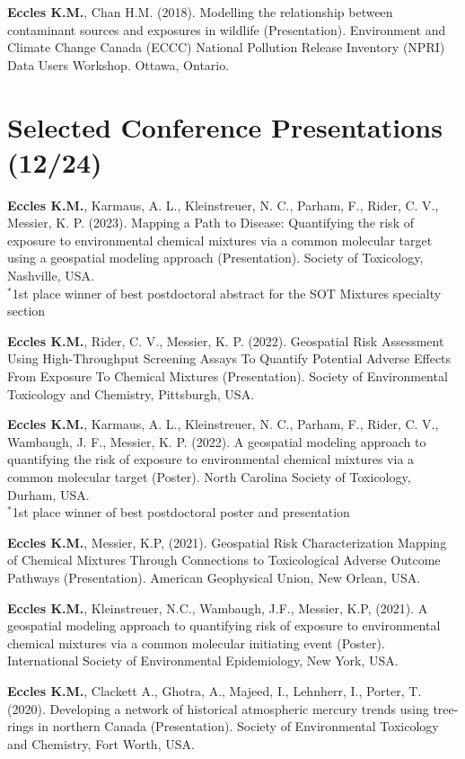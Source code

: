 \documentclass[margin,line]{res}
\begin{document}
\begin{resume}
\textbf{Eccles K.M.}, Chan H.M. (2018). Modelling the relationship between contaminant sources and exposures in wildlife (Presentation). Environment and Climate Change Canada (ECCC) National Pollution Release Inventory (NPRI) Data Users Workshop. Ottawa, Ontario.

\vspace*{.1in}
\section{\sc Selected Conference Presentations (12/24)}

\textbf{Eccles K.M.}, Karmaus, A. L., Kleinstreuer, N. C., Parham, F., Rider, C. V., Messier, K. P. (2023). Mapping a Path to Disease: Quantifying the risk of exposure to environmental chemical mixtures via a common molecular target using a geospatial modeling approach (Presentation). Society of Toxicology, Nashville, USA.\\
$^{*}$1st place winner of best postdoctoral abstract for the SOT Mixtures specialty section

\textbf{Eccles K.M.}, Rider, C. V., Messier, K. P. (2022). Geospatial Risk Assessment Using High-Throughput Screening Assays To Quantify Potential Adverse Effects From Exposure To Chemical Mixtures (Presentation). Society of Environmental Toxicology and Chemistry, Pittsburgh, USA.

\textbf{Eccles K.M.}, Karmaus, A. L., Kleinstreuer, N. C., Parham, F., Rider, C. V., Wambaugh, J. F., Messier, K. P. (2022). A geospatial modeling approach to quantifying the risk of exposure to environmental chemical mixtures via a common molecular target (Poster). North Carolina Society of Toxicology, Durham, USA.\\
$^{*}$1st place winner of best postdoctoral poster and presentation

\textbf{Eccles K.M.}, Messier, K.P, (2021). Geospatial Risk Characterization Mapping of Chemical Mixtures Through Connections to Toxicological Adverse Outcome Pathways (Presentation). American Geophysical Union, New Orlean, USA.

\textbf{Eccles K.M.}, Kleinstreuer, N.C., Wambaugh, J.F., Messier, K.P, (2021). A geospatial modeling approach to quantifying risk of exposure to environmental chemical mixtures via a common molecular initiating event (Poster). International Society of Environmental Epidemiology, New York, USA.

\textbf{Eccles K.M.}, Clackett A., Ghotra, A., Majeed, I., Lehnherr, I., Porter, T. (2020). Developing a network of historical atmospheric mercury trends using tree-rings in northern Canada (Presentation).  Society of Environmental Toxicology and Chemistry, Fort Worth, USA.


\end{resume}
\end{document}
